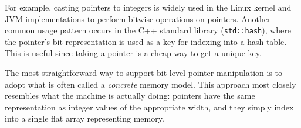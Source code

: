 For example, casting pointers to integers is
widely used in the Linux kernel and JVM implementations to perform bitwise operations on pointers.
Another common usage pattern occurs in the C++ standard library (\texttt{std::hash}),
where the pointer's bit representation is used as a key for indexing into
a hash table.
This is useful since taking a pointer is a cheap way to get a unique key.


%






The most straightforward way to support bit-level pointer 
manipulation is to adopt what is often called a \emph{concrete} memory
model. This approach most closely resembles what the machine is
actually doing: pointers have the same representation as integer
values of the appropriate width, and they simply index into a single
flat array representing memory.

